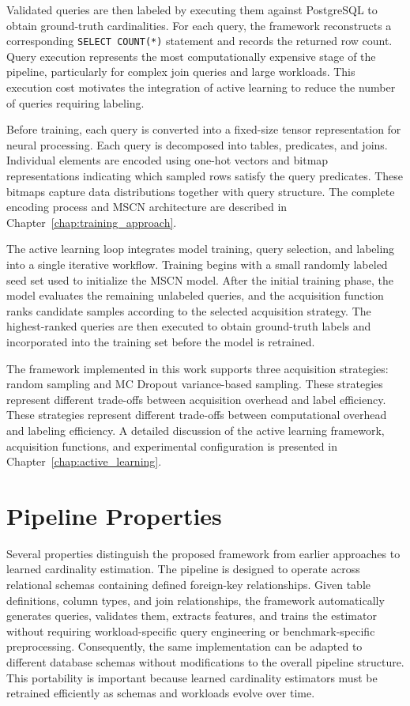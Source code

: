 Validated queries are then labeled by executing them against PostgreSQL to obtain ground-truth cardinalities. For each query, the framework reconstructs a corresponding \texttt{SELECT COUNT(*)} statement and records the returned row count. Query execution represents the most computationally expensive stage of the pipeline, particularly for complex join queries and large workloads. This execution cost motivates the integration of active learning to reduce the number of queries requiring labeling.

Before training, each query is converted into a fixed-size tensor representation for neural processing. Each query is decomposed into tables, predicates, and joins. Individual elements are encoded using one-hot vectors and bitmap representations indicating which sampled rows satisfy the query predicates. These bitmaps capture data distributions together with query structure. The complete encoding process and MSCN architecture are described in Chapter~\ref{chap:training_approach}.

The active learning loop integrates model training, query selection, and labeling into a single iterative workflow. Training begins with a small randomly labeled seed set used to initialize the MSCN model. After the initial training phase, the model evaluates the remaining unlabeled queries, and the acquisition function ranks candidate samples according to the selected acquisition strategy. The highest-ranked queries are then executed to obtain ground-truth labels and incorporated into the training set before the model is retrained.

The framework implemented in this work supports three acquisition strategies: random sampling and MC Dropout variance-based sampling. These strategies represent different trade-offs between acquisition overhead and label efficiency. These strategies represent different trade-offs between computational overhead and labeling efficiency. A detailed discussion of the active learning framework, acquisition functions, and experimental configuration is presented in Chapter~\ref{chap:active_learning}.


\section{Pipeline Properties}

Several properties distinguish the proposed framework from earlier approaches to learned cardinality estimation. The pipeline is designed to operate across relational schemas containing defined foreign-key relationships. Given table definitions, column types, and join relationships, the framework automatically generates queries, validates them, extracts features, and trains the estimator without requiring workload-specific query engineering or benchmark-specific preprocessing. Consequently, the same implementation can be adapted to different database schemas without modifications to the overall pipeline structure. This portability is important because learned cardinality estimators must be retrained efficiently as schemas and workloads evolve over time.

